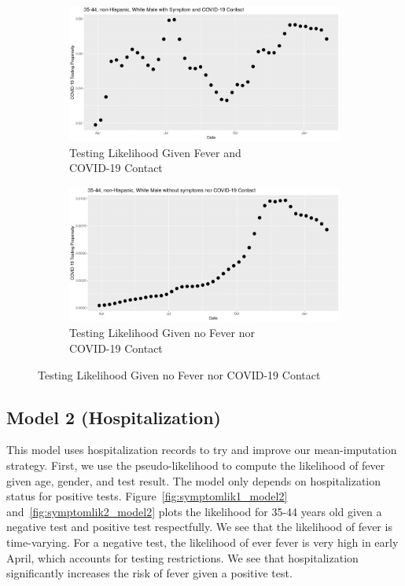 \documentclass[11pt]{amsart}
\numberwithin{equation}{section}
\theoremstyle{plain}
\begin{document}
\begin{figure}[!th]
\centering
\begin{subfigure}{.5\textwidth}
 \centering
 \includegraphics[width=.9\linewidth]{../figs/tvprop_fig1.png}
 \caption{Testing Likelihood Given Fever and \\COVID-19 Contact}
 \label{fig:testinglik1}
\end{subfigure}%
\begin{subfigure}{.5\textwidth}
 \centering
\includegraphics[width=.9\linewidth]{../figs/tvprop_fig2.png}
 \caption{Testing Likelihood Given no Fever nor \\  COVID-19 Contact}
 \label{fig:testinglik2}
\end{subfigure}
\caption{Testing Likelihood Given no Fever nor COVID-19 Contact}
\label{fig:testinglik}
\end{figure}

\subsection{Model 2 (Hospitalization)}

This model uses hospitalization records to try and improve our mean-imputation strategy.  First, we use the pseudo-likelihood to compute the likelihood of fever given age, gender, and test result.  The model only depends on hospitalization status for positive tests.  Figure~\ref{fig:symptomlik1_model2} and~\ref{fig:symptomlik2_model2} plots the likelihood for 35-44 years old given a negative test and positive test respectfully.  We see that the likelihood of fever is time-varying.  For a negative test, the likelihood of ever fever is very high in early April, which accounts for testing restrictions. We see that hospitalization significantly increases the risk of fever given a positive test.
\end{document}
